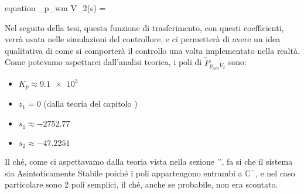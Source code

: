 \begin{Large}
	\begin{empheq}[box=\mathResult]{equation} \label{eq:StimaModelloInOut}
		_{p_{wm} V_2}(s) = 
	\end{empheq}
\end{Large}

\noindent
Nel seguito della tesi, questa funzione di trasferimento, con questi coefficienti, verrà usata nelle simulazioni del controllore, e ci permetterà di avere un idea qualitativa di come si comporterà il controllo una volta implementato nella realtà.\\
Come potevamo aspettarci dall'analisi teorica, i poli di $ \tilde{P}_{p_{wm} V_2} $ sono:
\begin{itemize}
	\item $ K_p \approx \num{9.1e3} $
	\item $ z_1 = 0 $ \tab\tab\tab(dalla teoria del capitolo )
	\item $ s_1\approx-2752.77 $
	\item $ s_2\approx-47.2251 $
\end{itemize}
\noindent
Il ché, come ci aspettavamo dalla teoria vista nella sezione '', fa si che il sistema sia Asintoticamente Stabile poiché i poli appartengono entrambi a $ \mathbb{C}^- $, e nel caso particolare sono 2 poli semplici, il ché, anche se probabile, non era scontato.

